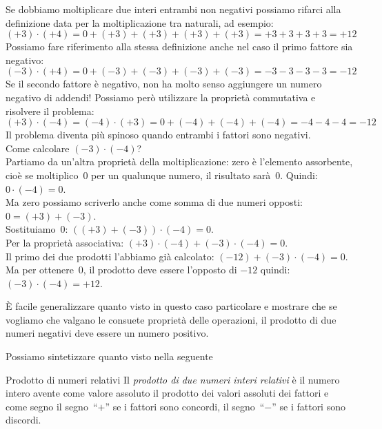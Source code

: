 Se dobbiamo moltiplicare due interi entrambi non negativi possiamo rifarci 
alla definizione data per la moltiplicazione tra naturali, ad esempio:
\[(+3) \cdot (+4) = 0 + (+3) + (+3) + (+3) + (+3) = +3+3+3+3 = +12\]
Possiamo fare riferimento alla stessa definizione anche nel caso il primo 
fattore sia negativo:
\[(-3) \cdot (+4) = 0 + (-3) + (-3) + (-3) + (-3) = -3-3-3-3 = -12\]
Se il secondo fattore è negativo, non ha molto senso aggiungere un numero 
negativo di addendi!
Possiamo però utilizzare la proprietà commutativa e risolvere il problema:
\[(+3) \cdot (-4) = (-4) \cdot (+3) = 
  0 + (-4) + (-4) + (-4) = -4-4-4 = -12\]
Il problema diventa più spinoso quando entrambi i fattori sono negativi.\\
Come calcolare \((-3) \cdot (-4)\)?\\
Partiamo da un'altra proprietà della moltiplicazione: zero è l'elemento 
assorbente, cioè se moltiplico~0 per un qualunque numero, il risultato 
sarà~0.
Quindi: \quad \(0 \cdot (-4) = 0\).\\
Ma zero possiamo scriverlo anche come somma di due numeri opposti: \quad 
\(0 = (+3) + (-3)\).\\
Sostituiamo~0: \quad \(((+3) + (-3)) \cdot (-4) = 0\).\\
Per la proprietà associativa: \quad 
\((+3) \cdot (-4) + (-3) \cdot (-4) = 0\).\\
Il primo dei due prodotti l'abbiamo già calcolato: \quad 
\((-12) + (-3) \cdot (-4) = 0\).\\
Ma per ottenere~0, il prodotto deve essere l'opposto di \(-12\) quindi: 
\quad \((-3) \cdot (-4) = +12\).

È facile generalizzare quanto visto in questo caso particolare e mostrare che 
se vogliamo che valgano le consuete proprietà delle operazioni, il prodotto 
di due numeri negativi deve essere un numero positivo.

Possiamo sintetizzare quanto visto nella seguente

\begin{definizione}{Prodotto di numeri relativi}{}
Il \emph{prodotto di due numeri interi relativi} è il numero intero avente 
come valore assoluto il prodotto dei valori assoluti dei fattori e come segno 
il segno~``\(+\)'' se i fattori sono concordi,
il segno~``\(-\)'' se i fattori sono discordi.
\end{definizione}

